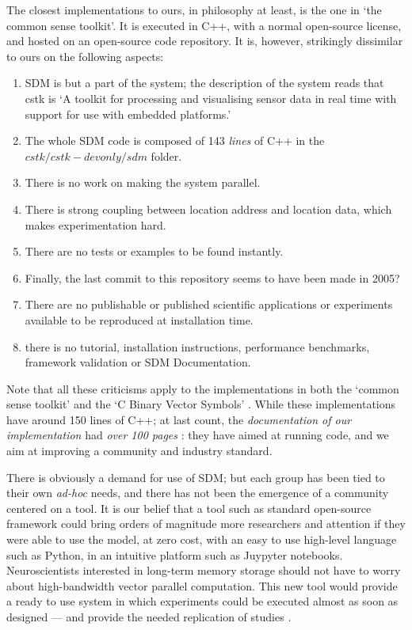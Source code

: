 The closest implementations to ours, in philosophy at least, is the one in `the common sense toolkit'. It is executed in C++, with a normal open-source license, and hosted on an open-source code repository.  It is, however, strikingly dissimilar to ours on the following aspects:

\begin{enumerate}
    \item SDM is but a part of the system; the description of the system reads that cstk is `A toolkit for processing and visualising sensor data in real time with support for use with embedded platforms.'

    \item The whole SDM code is composed of 143 \emph{lines} of C++ in the $cstk/cstk-devonly/sdm$ folder.

    \item There is no work on making the system parallel.

    \item There is strong coupling between location address and location data, which makes experimentation hard.

    \item There are no tests or examples to be found instantly.

    \item Finally, the last commit to this repository seems to have been made in 2005?

    \item There are no publishable or published scientific applications or experiments available to be reproduced at installation time.

    \item there is no tutorial, installation instructions, performance benchmarks, framework validation or SDM Documentation.

\end{enumerate}

Note that all these criticisms apply to the implementations in both the `common sense toolkit' and the `C Binary Vector Symbols' \citep{berchtold_processing_2005, noauthor_cstk:_nodate, emruli_vector_2015}.  While these implementations have around 150 lines of C++; at last count, the \emph{documentation of our implementation} had \emph{over 100 pages} \citep{linhares_sparse_2018}: they have aimed at running code, and we aim at improving a community and industry standard.

There is obviously a demand for use of SDM; but each group has been tied to their own \emph{ad-hoc} needs, and there has not been the emergence of a community centered on a tool. It is our belief that a tool such as standard open-source framework could bring orders of magnitude more researchers and attention if they were able to use the model, at zero cost, with an easy to use high-level language such as Python, in an intuitive platform such as Juypyter notebooks. Neuroscientists interested in long-term memory storage should not have to worry about high-bandwidth vector parallel computation.  This new tool would provide a ready to use system in which experiments could be executed almost as soon as designed --- and provide the needed replication of studies \citep{shen2014interactive}.

